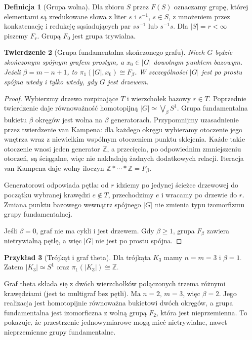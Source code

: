\documentclass[11pt,a4paper]{report}
\numberwithin{equation}{section}
\theoremstyle{plain}
\newtheorem{twierdzenie}{Twierdzenie}[section]
\theoremstyle{definition}
\newtheorem{definicja}[twierdzenie]{Definicja}
\newtheorem{przyklad}[twierdzenie]{Przykład}
\theoremstyle{remark}
\begin{document}
\begin{definicja}[Grupa wolna]
Dla zbioru $S$ przez $F(S)$ oznaczamy grupę, której elementami
są zredukowane słowa z liter $s$ i $s^{-1}$, $s\in S$,
z mnożeniem przez konkatenację i redukcję sąsiadujących par
$s s^{-1}$ lub $s^{-1}s$. Dla $|S|=r<\infty$ piszemy $F_r$.
Grupą $F_0$ jest grupa trywialna.
\end{definicja}

\begin{twierdzenie}[Grupa fundamentalna skończonego grafu]
\label{thm:tg-free-pi1}
Niech $G$ będzie skończonym spójnym grafem prostym,
a $x_0\in|G|$ dowolnym punktem bazowym. Jeżeli
$\beta=m-n+1$, to $\pi_1(|G|,x_0)\cong F_\beta$.
W szczególności $|G|$ jest po prostu spójna wtedy i tylko
wtedy, gdy $G$ jest drzewem.
\end{twierdzenie}

\begin{proof}
Wybierzmy drzewo rozpinające $T$ i wierzchołek bazowy
$r\in T$. Poprzednie twierdzenie daje równoważność
homotopijną $|G|\simeq\bigvee_\beta S^1$.
Grupa fundamentalna bukietu $\beta$ okręgów jest wolna
na $\beta$ generatorach. Przypomnijmy uzasadnienie
przez twierdzenie van Kampena: dla każdego okręgu
wybieramy otoczenie jego wnętrza wraz z niewielkim wspólnym
otoczeniem punktu sklejenia. Każde takie otoczenie wnosi
jeden generator $\mathbb Z$, a przecięcia, po odpowiednim
zmniejszeniu otoczeń, są ściągalne, więc nie nakładają
żadnych dodatkowych relacji. Iteracja van Kampena
daje wolny iloczyn $\mathbb Z*\cdots*\mathbb Z=F_\beta$.

Generatorowi odpowiada pętla: od $r$ idziemy po jedynej
ścieżce drzewowej do początku wybranej krawędzi
$e\notin T$, przechodzimy $e$ i wracamy po drzewie do $r$.
Zmiana punktu bazowego wewnątrz spójnego $|G|$ nie zmienia
typu izomorfizmu grupy fundamentalnej.

Jeśli $\beta=0$, graf nie ma cykli i jest drzewem.
Gdy $\beta\ge1$, grupa $F_\beta$ zawiera nietrywialną
pętlę, a więc $|G|$ nie jest po prostu spójna.
\end{proof}

\begin{przyklad}[Trójkąt i graf theta]
Dla trójkąta $K_3$ mamy $n=m=3$ i $\beta=1$.
Zatem $|K_3|\simeq S^1$ oraz
$\pi_1(|K_3|)\cong\mathbb Z$.

Graf theta składa się z dwóch wierzchołków połączonych
trzema różnymi krawędziami (jest to multigraf bez pętli).
Ma $n=2$, $m=3$, więc $\beta=2$.
Jego realizacja jest homotopijnie równoważna bukietowi
dwóch okręgów, a grupa fundamentalna jest izomorficzna
z wolną grupą $F_2$, która jest nieprzemienna.
To pokazuje, że przestrzenie jednowymiarowe mogą mieć
nietrywialne, nawet nieprzemienne grupy fundamentalne.
\end{przyklad}
\end{document}
